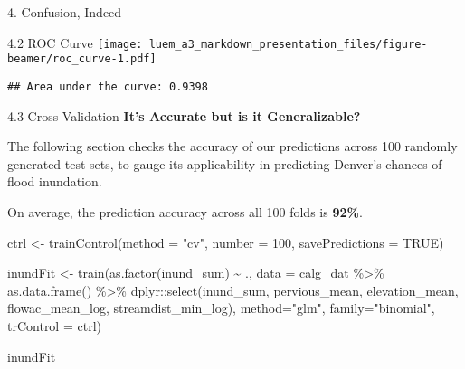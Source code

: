 \documentclass[
  ignorenonframetext,
]{beamer}
\newenvironment{Shaded}{\begin{snugshade}}{\end{snugshade}}
\newcommand{\AttributeTok}[1]{\textcolor[rgb]{0.77,0.63,0.00}{#1}}
\newcommand{\ConstantTok}[1]{\textcolor[rgb]{0.00,0.00,0.00}{#1}}
\newcommand{\DecValTok}[1]{\textcolor[rgb]{0.00,0.00,0.81}{#1}}
\newcommand{\FunctionTok}[1]{\textcolor[rgb]{0.00,0.00,0.00}{#1}}
\newcommand{\NormalTok}[1]{#1}
\newcommand{\OtherTok}[1]{\textcolor[rgb]{0.56,0.35,0.01}{#1}}
\newcommand{\SpecialCharTok}[1]{\textcolor[rgb]{0.00,0.00,0.00}{#1}}
\newcommand{\StringTok}[1]{\textcolor[rgb]{0.31,0.60,0.02}{#1}}
\begin{document}
\begin{frame}[fragile]{4. Confusion, Indeed}
\begin{block}{4.2 ROC Curve}
\texttt{[image: luem\_a3\_markdown\_presentation\_files/figure-beamer/roc\_curve-1.pdf]}

\begin{Shaded}
\end{Shaded}

\begin{verbatim}
## Area under the curve: 0.9398
\end{verbatim}
\end{block}

\begin{block}{4.3 Cross Validation}
\protect\hypertarget{cross-validation}{}
\textbf{It's Accurate but is it Generalizable?}

The following section checks the accuracy of our predictions across 100
randomly generated test sets, to gauge its applicability in predicting
Denver's chances of flood inundation.

On average, the prediction accuracy across all 100 folds is
\textbf{92\%}.

\begin{Shaded}
\begin{Highlighting}[]
\NormalTok{ctrl }\OtherTok{\textless{}{-}} \FunctionTok{trainControl}\NormalTok{(}\AttributeTok{method =} \StringTok{"cv"}\NormalTok{, }
                     \AttributeTok{number =} \DecValTok{100}\NormalTok{, }
                     \AttributeTok{savePredictions =} \ConstantTok{TRUE}\NormalTok{)}

\NormalTok{inundFit }\OtherTok{\textless{}{-}} \FunctionTok{train}\NormalTok{(}\FunctionTok{as.factor}\NormalTok{(inund\_sum) }\SpecialCharTok{\textasciitilde{}}\NormalTok{ .,}
               \AttributeTok{data =}\NormalTok{ calg\_dat }\SpecialCharTok{\%\textgreater{}\%} 
                 \FunctionTok{as.data.frame}\NormalTok{() }\SpecialCharTok{\%\textgreater{}\%}
\NormalTok{                 dplyr}\SpecialCharTok{::}\FunctionTok{select}\NormalTok{(inund\_sum, pervious\_mean, elevation\_mean, flowac\_mean\_log, streamdist\_min\_log), }
               \AttributeTok{method=}\StringTok{"glm"}\NormalTok{, }\AttributeTok{family=}\StringTok{"binomial"}\NormalTok{,}
               \AttributeTok{trControl =}\NormalTok{ ctrl)}

\NormalTok{inundFit}
\end{Highlighting}
\end{Shaded}


\end{block}
\end{frame}
\end{document}
